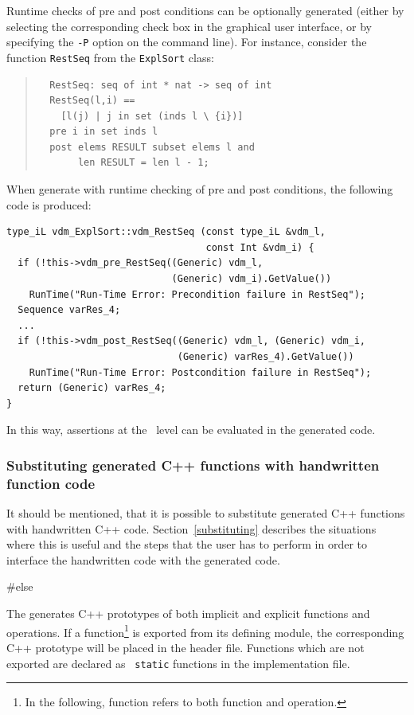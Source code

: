 \documentclass[\pformat,12pt]{article}
\begin{document}
Runtime checks of pre and post conditions can be optionally generated
(either by selecting the corresponding check box in the graphical user
interface, or by specifying the \texttt{-P} option on the command
line). For instance, consider the function \texttt{RestSeq} from the
\texttt{ExplSort} class:
\begin{quote}
\begin{verbatim}
  RestSeq: seq of int * nat -> seq of int
  RestSeq(l,i) ==
    [l(j) | j in set (inds l \ {i})]
  pre i in set inds l
  post elems RESULT subset elems l and
       len RESULT = len l - 1;
\end{verbatim}
\end{quote}
When generate with runtime checking of pre and post conditions, the
following code is produced:
\begin{verbatim}
type_iL vdm_ExplSort::vdm_RestSeq (const type_iL &vdm_l, 
                                   const Int &vdm_i) {
  if (!this->vdm_pre_RestSeq((Generic) vdm_l, 
                             (Generic) vdm_i).GetValue())
    RunTime("Run-Time Error: Precondition failure in RestSeq");
  Sequence varRes_4;
  ...
  if (!this->vdm_post_RestSeq((Generic) vdm_l, (Generic) vdm_i, 
                              (Generic) varRes_4).GetValue())
    RunTime("Run-Time Error: Postcondition failure in RestSeq");
  return (Generic) varRes_4; 
}
\end{verbatim}
In this way, assertions at the \VDM\ level can be evaluated in the
generated code.

\subsubsection*{Substituting generated C++ functions with handwritten function code}
It should be mentioned, that it is possible to substitute generated
C++ functions with handwritten C++ code. Section~\ref{substituting}
describes the situations where this is useful and the steps that the user
has to perform in order to interface the handwritten code with the
generated code.

#else

The \cg{} generates C++ prototypes of both implicit and explicit
functions and operations. If a function\footnote{In the following,
  function refers to both function and operation.} is exported from
its defining module, the corresponding C++ prototype will be placed in
the header file. Functions which are not exported are declared as {\tt
  static} functions in the implementation file. 
\end{document}
